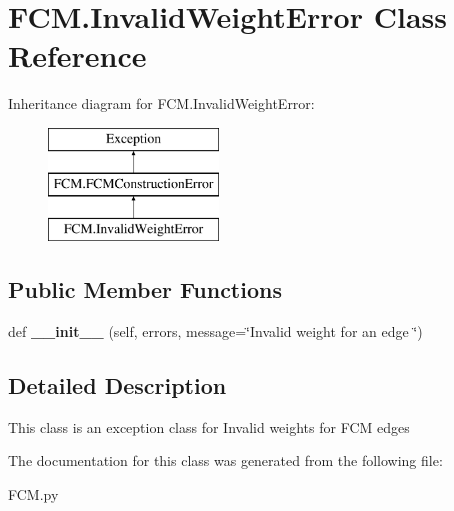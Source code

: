 \hypertarget{class_f_c_m_1_1_invalid_weight_error}{}\section{F\+C\+M.\+Invalid\+Weight\+Error Class Reference}
\label{class_f_c_m_1_1_invalid_weight_error}
Inheritance diagram for F\+C\+M.\+Invalid\+Weight\+Error\+:\begin{figure}[H]
\begin{center}
\leavevmode
\includegraphics[height=3.000000cm]{class_f_c_m_1_1_invalid_weight_error}
\end{center}
\end{figure}
\subsection*{Public Member Functions}
\begin{DoxyCompactItemize}
\item 
\hypertarget{class_f_c_m_1_1_invalid_weight_error_a0727a96acad375593fb2e619fddce1ba}{}\label{class_f_c_m_1_1_invalid_weight_error_a0727a96acad375593fb2e619fddce1ba} 
def {\bfseries \+\_\+\+\_\+init\+\_\+\+\_\+} (self, errors, message=\char`\"{}Invalid weight for an edge \char`\"{})
\end{DoxyCompactItemize}


\subsection{Detailed Description}
\begin{DoxyVerb}This class is an exception class for Invalid weights for FCM edges
\end{DoxyVerb}
 

The documentation for this class was generated from the following file\+:\begin{DoxyCompactItemize}
\item 
F\+C\+M.\+py\end{DoxyCompactItemize}
